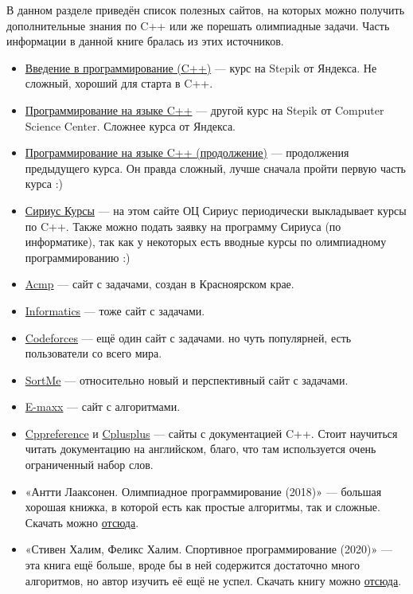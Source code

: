 \hypertarget{0.5}{}
В данном разделе приведён список полезных сайтов, на которых можно получить дополнительные знания по C++ или же порешать олимпиадные задачи. Часть информации в данной книге бралась из этих источников.

\begin{itemize}
    \item \href{https://stepik.org/course/363/}{Введение в программирование (C++)} — курс на Stepik от Яндекса. Не сложный, хороший для старта в C++.
    \item \href{https://stepik.org/course/7/}{Программирование на языке C++} — другой курс на Stepik от Computer Science Center. Сложнее курса от Яндекса.
    \item \href{https://stepik.org/course/3206/}{Программирование на языке C++ (продолжение)} — продолжения предыдущего курса. Он правда сложный, лучше сначала пройти первую часть курса :)
    \item \href{https://edu.sirius.online/}{Сириус Курсы} — на этом сайте ОЦ Сириус периодически выкладывает курсы по C++. Также можно подать заявку на программу Сириуса (по информатике), так как у некоторых есть вводные курсы по олимпиадному программированию :)
    \item \href{https://acmp.ru/}{Acmp} — сайт с задачами, создан в Красноярском крае.
    \item \href{https://informatics.msk.ru/}{Informatics} — тоже сайт с задачами.
    \item \href{https://codeforces.com/}{Codeforces} — ещё один сайт с задачами. но чуть популярней, есть пользователи со всего мира.
    \item \href{https://sort-me.org/}{SortMe} — относительно новый и перспективный сайт с задачами.
    \item \href{https://e-maxx.ru/algo/}{E-maxx} — сайт с алгоритмами.
    \item \href{https://ru.cppreference.com/w/}{Cppreference} и \href{https://cplusplus.com/reference/}{Cplusplus} — сайты с документацией C++. Стоит научиться читать документацию на английском, благо, что там используется очень ограниченный набор слов.
    \item «Антти Лааксонен. Олимпиадное программирование (2018)» — большая хорошая книжка, в которой есть как простые алгоритмы, так и сложные. Скачать можно \href{https://drive.google.com/file/d/13RWpaWUpPlMzVGGMzvMm6cjCxWzYzolI/view?usp=sharing}{отсюда}.
    \item «Стивен Халим, Феликс Халим. Спортивное программирование (2020)» — эта книга ещё больше, вроде бы в ней содержится достаточно много алгоритмов, но автор изучить её ещё не успел. Скачать книгу можно \href{https://drive.google.com/file/d/1TS8rambgTvplQ1Xpxl_GTbGZ3O9liV9C/view?usp=sharing}{отсюда}.
\end{itemize}

